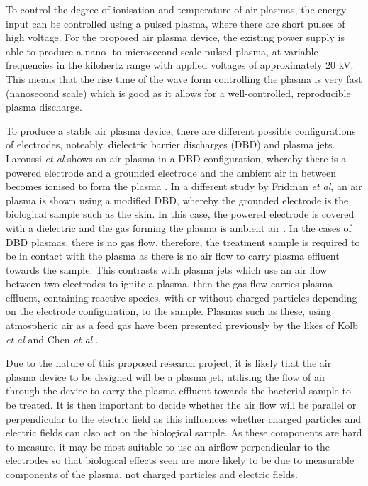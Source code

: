 \documentclass[11pt, oneside]{article}   	%
\begin{document}
To control the degree of ionisation and temperature of air plasmas, the energy input can be controlled using a pulsed plasma, where there are short pulses of high voltage.
For the proposed air plasma device, the existing power supply is able to produce a nano- to microsecond scale pulsed plasma, at variable frequencies in the kilohertz range with applied voltages of approximately 20 kV. This means that the rise time of the wave form controlling the plasma is very fast (nanosecond scale) which is good as it allows for a well-controlled, reproducible plasma discharge.

To produce a stable air plasma device, there are different possible configurations of electrodes, noteably, dielectric barrier discharges (DBD) and plasma jets. Laroussi \textit{et al} shows an air plasma in a DBD configuration, whereby there is a powered electrode and a grounded electrode and the ambient air in between becomes ionised to form the plasma \cite{Laroussi2004evaluation}. In a different study by Fridman \textit{et al}, an air plasma is shown using a modified DBD, whereby the grounded electrode is the biological sample such as the skin. In this case, the powered electrode is covered with a dielectric and the gas forming the plasma is ambient air \cite{Fridman2007floating}. In the cases of DBD plasmas, there is no gas flow, therefore, the treatment sample is required to be in contact with the plasma as there is no air flow to carry plasma effluent towards the sample. This contrasts with plasma jets which use an air flow between two electrodes to ignite a plasma, then the gas flow carries plasma effluent, containing reactive species, with or without charged particles depending on the electrode configuration, to the sample. Plasmas such as these, using atmospheric air as a feed gas have been presented previously by the likes of Kolb \textit{et al} and Chen \textit{et al} \cite{Kolb2008cold, Chen2009blood}.

Due to the nature of this proposed research project, it is likely that the air plasma device to be designed will be a plasma jet, utilising the flow of air through the device to carry the plasma effluent towards the bacterial sample to be treated. It is then important to decide whether the air flow will be parallel or perpendicular to the electric field as this influences whether charged particles and electric fields can also act on the biological sample. As these components are hard to measure, it may be most suitable to use an airflow perpendicular to the electrodes so that biological effects seen are more likely to be due to measurable components of the plasma, not charged particles and electric fields.
\end{document}
